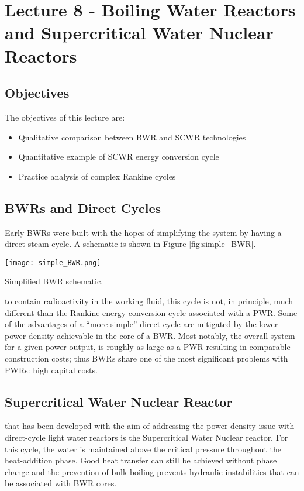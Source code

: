 \chapter{Lecture 8 - Boiling Water Reactors and Supercritical Water Nuclear Reactors}
\label{ch:ch8}
\section{Objectives}
The objectives of this lecture are:
\begin{itemize}
\item Qualitative comparison between BWR and SCWR technologies
\item Quantitative example of SCWR energy conversion cycle
\item Practice analysis of complex Rankine cycles
\end{itemize}

\section{BWRs and Direct Cycles}
Early BWRs were built with the hopes of simplifying the system by having a direct steam cycle.  A schematic is shown in Figure \ref{fig:simple_BWR}.  
\begin{marginfigure}
\texttt{[image: simple\_BWR.png]}
\caption{Simplified BWR schematic.}
\label{fig:simple_BWR}
\end{marginfigure}
 to contain radioactivity in the working fluid, this cycle is not, in principle, much different than the Rankine energy conversion cycle associated with a PWR.  Some of the advantages of a ``more simple'' direct cycle are mitigated by the lower power density achievable in the core of a BWR.  Most notably, the overall system for a given power output, is roughly as large as a PWR resulting in comparable construction costs; thus BWRs share one of the most significant problems with PWRs: high capital costs.

\section{Supercritical Water Nuclear Reactor}
 that has been developed with the aim of addressing the power-density issue with direct-cycle light water reactors is the Supercritical Water Nuclear reactor.\cite{tsiklauri2005supercritical} For this cycle, the water is maintained above the critical pressure throughout the heat-addition phase.  Good heat transfer can still be achieved without phase change and the prevention of bulk boiling prevents hydraulic instabilities that can be associated with BWR cores.  

